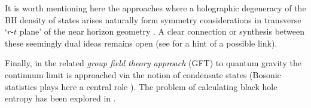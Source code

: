 \documentclass[aps, nofootinbib,superscriptaddress,12pt]{revtex4-2}
\begin{document}
It is worth mentioning here the approaches where a holographic degeneracy of the BH density of states arises naturally form symmetry considerations in transverse `$r$-$t$ plane'  of the near horizon geometry \cite{Carlip:1998wz, Carlip:1999cy, Carlip:2002be, Dreyer:2013noa, Dreyer:2001py, Carlip:2014bfa}. A  clear connection or synthesis between these seemingly dual ideas remains open (see \cite{Pranzetti:2013lma} for a hint of a possible link).

Finally, in the related {\em group field theory approach} (GFT) to quantum gravity \cite{Oriti:2013aqa, Oriti:2014uga} the continuum limit is approached via the notion of condensate states (Bosonic statistics plays here a central role \cite{Gielen:2013naa}). The problem of calculating black hole entropy has been explored in \cite{Oriti:2015rwa}.
\end{document}
